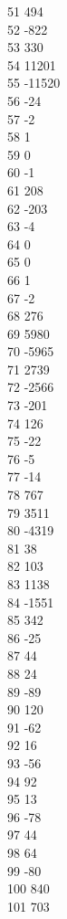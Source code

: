 { 51	494 \\
 52	-822 \\
 53	330 \\
 54	11201 \\
 55	-11520 \\
 56	-24 \\
 57	-2 \\
 58	1 \\
 59	0 \\
 60	-1 \\
 61	208 \\
 62	-203 \\
 63	-4 \\
 64	0 \\
 65	0 \\
 66	1 \\
 67	-2 \\
 68	276 \\
 69	5980 \\
 70	-5965 \\
 71	2739 \\
 72	-2566 \\
 73	-201 \\
 74	126 \\
 75	-22 \\
 76	-5 \\
 77	-14 \\
 78	767 \\
 79	3511 \\
 80	-4319 \\
 81	38 \\
 82	103 \\
 83	1138 \\
 84	-1551 \\
 85	342 \\
 86	-25 \\
 87	44 \\
 88	24 \\
 89	-89 \\
 90	120 \\
 91	-62 \\
 92	16 \\
 93	-56 \\
 94	92 \\
 95	13 \\
 96	-78 \\
 97	44 \\
 98	64 \\
 99	-80 \\
 100	840 \\
 101	703 \\
}

